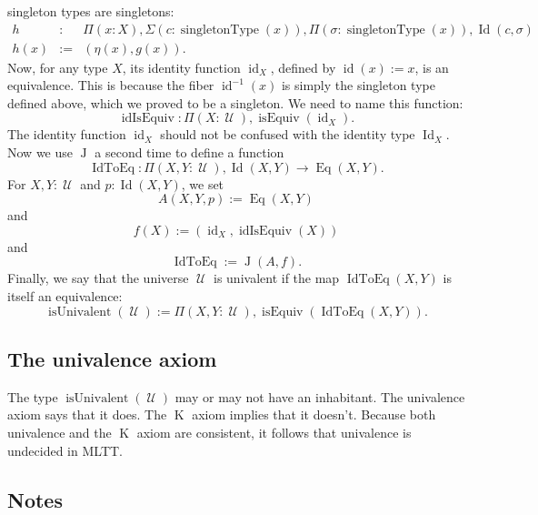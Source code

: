 \documentclass{article}
\newcommand{\Id}{\operatorname{Id}}
\newcommand{\J}{\operatorname{J}}
\newcommand{\K}{\operatorname{K}}
\newcommand{\U}{\operatorname{\mathcal{U}}}
\newcommand{\isEquiv}{\operatorname{isEquiv}}
\newcommand{\Eq}{\operatorname{Eq}}
\newcommand{\singletonType}{\operatorname{singletonType}}
\newcommand{\id}{\operatorname{id}}
\newcommand{\idIsEquiv}{\operatorname{idIsEquiv}}
\newcommand{\IdToEq}{\operatorname{IdToEq}}
\newcommand{\isUnivalent}{\operatorname{isUnivalent}}
\begin{document}
singleton types are singletons:
\begin{eqnarray*}
   h & : & \Pi(x:X), \Sigma(c:\singletonType(x)), \Pi(\sigma :\singletonType(x)), \Id(c,\sigma )\\
   h(x) & := & (\eta(x),g(x)).
\end{eqnarray*}
Now, for any type $X$, its identity function $\id_X$, defined by
$\id(x) := x$, is an equivalence. This is because the fiber
$\id^{-1}(x)$ is simply the singleton type defined above, which we
proved to be a singleton. We need to name this function:
\[
   \idIsEquiv : \Pi(X:\U), \isEquiv(\id_X).
 \]
The identity function $\id_X$ should not be confused with the identity
type $\Id_X$. Now we use $\J$ a second time to define a function
\[
   \IdToEq : \Pi(X,Y:\U), \Id(X,Y) \to  \Eq(X,Y).
\]
For $X,Y:\U$ and $p:\Id(X,Y)$, we set
\[
   A(X,Y,p) := \Eq(X,Y)
\]  
and
\[
   f(X) := (\id_X , \idIsEquiv(X))
\]
and
\[
   \IdToEq := \J(A,f).
\]
Finally, we say that the universe $\U$ is univalent if the map
$\IdToEq(X,Y)$ is itself an equivalence:
\[
   \isUnivalent(\U) := \Pi(X,Y:\U), \isEquiv(\IdToEq(X,Y)).
\]

\subsection{The univalence axiom}

The type $\isUnivalent(\U)$ may or may not have an inhabitant. The
univalence axiom says that it does. The $\K$ axiom implies that it doesn't. 
Because both univalence and the $\K$ axiom are consistent, it follows that univalence is undecided in MLTT.

\subsection{Notes}
\end{document}
